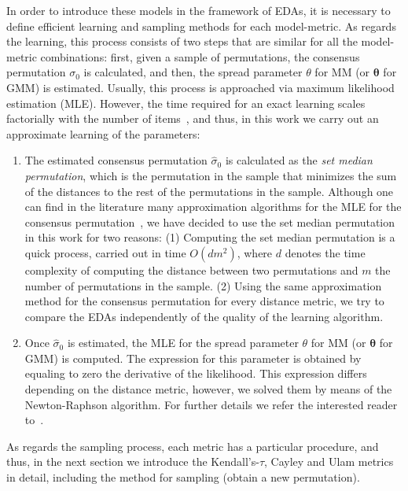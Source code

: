 \documentclass[conference]{IEEEtran}
\begin{document}
In order to introduce these models in the framework of EDAs, it is necessary to define efficient learning and sampling methods for each model-metric. As regards the learning, this process consists of two steps that are similar for all the model-metric combinations: first, given a sample of permutations, the consensus permutation $\sigma_0$ is calculated, and then, the spread parameter $\theta$ for MM (or $\boldsymbol\theta$ for GMM) is estimated. Usually, this process is approached via maximum likelihood estimation (MLE). However, the time required for an exact learning scales factorially with the number of items~\cite{ceberio13a,irurozki2013a,irurozki2013b}, and thus, in this work we carry out an approximate learning of the parameters:
\begin{enumerate}
\item The estimated consensus permutation $\hat \sigma_0$ is calculated as the {\it set median permutation}, which is the permutation in the sample that minimizes the sum of the distances to the rest of the permutations in the sample. Although one can find in the literature many approximation algorithms for the MLE for the consensus permutation~\cite{ali2011}, we have decided to use the set median permutation in this work for two reasons: (1) Computing the set median permutation is a quick process, carried out in time $O(dm^2)$, where $d$ denotes the time complexity of computing the distance between two permutations and $m$ the number of permutations in the sample. (2) Using the same approximation method for the consensus permutation for every distance metric, we try to compare the EDAs independently of the quality of the learning algorithm.

\item Once $\hat\sigma_0$ is estimated, the MLE for the spread parameter $\theta$ for MM (or $\boldsymbol \theta$ for GMM) is computed. The expression for this parameter is obtained by equaling to zero the derivative of the likelihood. This expression differs depending on the distance metric, however, we solved them by means of the Newton-Raphson algorithm. For further details we refer the interested reader to~\cite{irurozki2013c,ceberio13a}.
\end{enumerate}

As regards the sampling process, each metric has a particular procedure, and thus, in the next section we introduce the Kendall's-$\tau$, Cayley and Ulam metrics in detail, including the method for sampling (obtain a new permutation).
\end{document}
